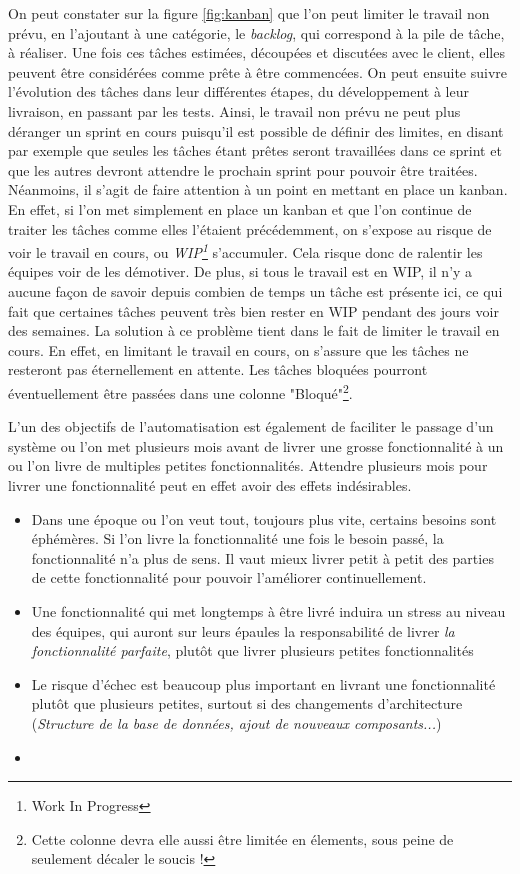 On peut constater sur la figure \ref{fig:kanban} que l'on peut limiter le travail non prévu, en l'ajoutant à une catégorie, le \emph{backlog}, qui correspond à la pile de tâche, à réaliser. Une fois ces tâches estimées, découpées et discutées avec le client, elles peuvent être considérées comme prête à être commencées. On peut ensuite suivre l'évolution des tâches dans leur différentes étapes, du développement à leur livraison, en passant par les tests. Ainsi, le travail non prévu ne peut plus déranger un sprint en cours puisqu'il est possible de définir des limites, en disant par exemple que seules les tâches étant prêtes seront travaillées dans ce sprint et que les autres devront attendre le prochain sprint pour pouvoir être traitées. Néanmoins, il s'agit de faire attention à un point en mettant en place un kanban. En effet, si l'on met simplement en place un kanban et que l'on continue de traiter les tâches comme elles l'étaient précédemment, on s'expose au risque de voir le travail en cours, ou \emph{WIP\footnote{Work In Progress}} s'accumuler. Cela risque donc de ralentir les équipes voir de les démotiver. De plus, si tous le travail est en WIP, il n'y a aucune façon de savoir depuis combien de temps un tâche est présente ici, ce qui fait que certaines tâches peuvent très bien rester en WIP pendant des jours voir des semaines. La solution à ce problème tient dans le fait de limiter le travail en cours. En effet, en limitant le travail en cours, on s'assure que les tâches ne resteront pas éternellement en attente. Les tâches bloquées pourront éventuellement être passées dans une colonne "Bloqué"\footnote{Cette colonne devra elle aussi être limitée en élements, sous peine de seulement décaler le soucis !}.

L'un des objectifs de l'automatisation est également de faciliter le passage d'un système ou l'on met plusieurs mois avant de livrer une grosse fonctionnalité à un ou l'on livre de multiples petites fonctionnalités. Attendre plusieurs mois pour livrer une fonctionnalité peut en effet avoir des effets indésirables.

\begin{itemize}
	\item Dans une époque ou l'on veut tout, toujours plus vite, certains besoins sont éphémères. Si l'on livre la fonctionnalité une fois le besoin passé, la fonctionnalité n'a plus de sens. Il vaut mieux livrer petit à petit des parties de cette fonctionnalité pour pouvoir l'améliorer continuellement.
	\item Une fonctionnalité qui met longtemps à être livré induira un stress au niveau des équipes, qui auront sur leurs épaules la responsabilité de livrer \emph{la fonctionnalité parfaite}, plutôt que livrer plusieurs petites fonctionnalités
	\item Le risque d'échec est beaucoup plus important en livrant une fonctionnalité plutôt que plusieurs petites, surtout si des changements d'architecture (\emph{Structure de la base de données, ajout de nouveaux composants...})
	\item {}
\end{itemize}

